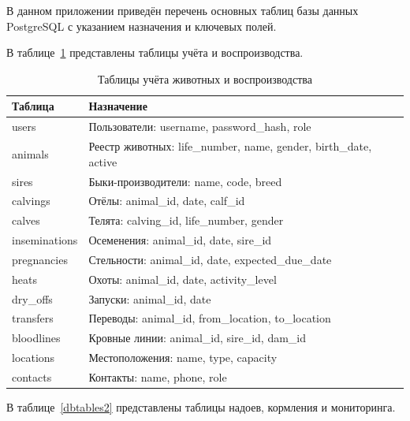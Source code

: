 \label{app-db}

В данном приложении приведён перечень основных таблиц базы данных PostgreSQL с указанием назначения и ключевых полей.

В таблице~\ref{dbtables1} представлены таблицы учёта и воспроизводства.

\begin{table}
  \caption{Таблицы учёта животных и воспроизводства}
  \begin{tabular}{|l|p{8cm}|}
    \hline
    \textbf{Таблица} & \textbf{Назначение} \\
    \hline
    users & Пользователи: username, password\_hash, role \\
    \hline
    animals & Реестр животных: life\_number, name, gender, birth\_date, active \\
    \hline
    sires & Быки-производители: name, code, breed \\
    \hline
    calvings & Отёлы: animal\_id, date, calf\_id \\
    \hline
    calves & Телята: calving\_id, life\_number, gender \\
    \hline
    inseminations & Осеменения: animal\_id, date, sire\_id \\
    \hline
    pregnancies & Стельности: animal\_id, date, expected\_due\_date \\
    \hline
    heats & Охоты: animal\_id, date, activity\_level \\
    \hline
    dry\_offs & Запуски: animal\_id, date \\
    \hline
    transfers & Переводы: animal\_id, from\_location, to\_location \\
    \hline
    bloodlines & Кровные линии: animal\_id, sire\_id, dam\_id \\
    \hline
    locations & Местоположения: name, type, capacity \\
    \hline
    contacts & Контакты: name, phone, role \\
    \hline
  \end{tabular}
  \label{dbtables1}
\end{table}

В таблице~\ref{dbtables2} представлены таблицы надоев, кормления и мониторинга.

